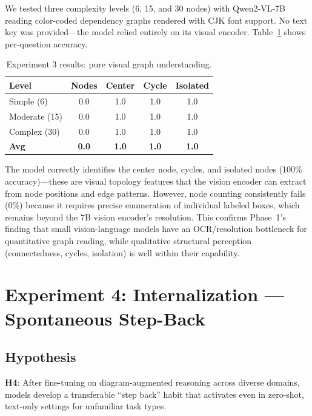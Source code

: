 \documentclass[11pt,a4paper]{article}
\begin{document}
We tested three complexity levels (6, 15, and 30 nodes) with Qwen2-VL-7B reading color-coded dependency graphs rendered with CJK font support. No text key was provided---the model relied entirely on its visual encoder. Table~\ref{tab:exp3_res} shows per-question accuracy.

\begin{table}[h]
\centering
\caption{Experiment 3 results: pure visual graph understanding.}
\label{tab:exp3_res}
\begin{tabular}{lcccc}
\toprule
\textbf{Level} & \textbf{Nodes} & \textbf{Center} & \textbf{Cycle} & \textbf{Isolated} \\
\midrule
Simple (6)   & 0.0 & 1.0 & 1.0 & 1.0 \\
Moderate (15) & 0.0 & 1.0 & 1.0 & 1.0 \\
Complex (30)  & 0.0 & 1.0 & 1.0 & 1.0 \\
\midrule
\textbf{Avg}  & \textbf{0.0} & \textbf{1.0} & \textbf{1.0} & \textbf{1.0} \\
\bottomrule
\end{tabular}
\end{table}

The model correctly identifies the center node, cycles, and isolated nodes (100\% accuracy)---these are visual topology features that the vision encoder can extract from node positions and edge patterns. However, node counting consistently fails (0\%) because it requires precise enumeration of individual labeled boxes, which remains beyond the 7B vision encoder's resolution. This confirms Phase~1's finding that small vision-language models have an OCR/resolution bottleneck for quantitative graph reading, while qualitative structural perception (connectedness, cycles, isolation) is well within their capability.


\section{Experiment 4: Internalization — Spontaneous Step-Back}

\subsection{Hypothesis}

\textbf{H4}: After fine-tuning on diagram-augmented reasoning across diverse domains, models develop a transferable ``step back'' habit that activates even in zero-shot, text-only settings for unfamiliar task types.
\end{document}
